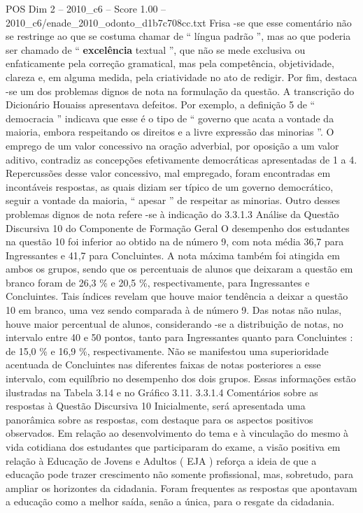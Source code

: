 \begin{textsample}{POS Dim 2 – 2010\_c6 – Score 1.00 – 2010\_c6/enade\_2010\_odonto\_d1b7c708cc.txt}
Frisa -se que esse comentário não se restringe ao que se costuma chamar de “ língua padrão ”, mas ao que poderia ser chamado de “ \textbf{excelência} textual ”, que não se mede exclusiva ou enfaticamente pela correção gramatical, mas pela competência, objetividade, clareza e, em alguma medida, pela criatividade no ato de redigir.
Por fim, destaca -se um dos problemas dignos de nota na formulação da questão.
A transcrição do Dicionário Houaiss apresentava defeitos.
Por exemplo, a definição 5 de “ democracia ” indicava que esse é o tipo de “ governo que acata a vontade da maioria, embora respeitando os direitos e a livre expressão das minorias ”.
O emprego de um valor concessivo na oração adverbial, por oposição a um valor aditivo, contradiz as concepções efetivamente democráticas apresentadas de 1 a 4.
Repercussões desse valor concessivo, mal empregado, foram encontradas em incontáveis respostas, as quais diziam ser típico de um governo democrático, seguir a vontade da maioria, “ apesar ” de respeitar as minorias.
Outro desses problemas dignos de nota refere -se à indicação do 3.3.1.3 Análise da Questão Discursiva 10 do Componente de Formação Geral O desempenho dos estudantes na questão 10 foi inferior ao obtido na de número 9, com nota média 36,7 para Ingressantes e 41,7 para Concluintes.
A nota máxima também foi atingida em ambos os grupos, sendo que os percentuais de alunos que deixaram a questão em branco foram de 26,3 \% e 20,5 \%, respectivamente, para Ingressantes e Concluintes.
Tais índices revelam que houve maior tendência a deixar a questão 10 em branco, uma vez sendo comparada à de número 9.
Das notas não nulas, houve maior percentual de alunos, considerando -se a distribuição de notas, no intervalo entre 40 e 50 pontos, tanto para Ingressantes quanto para Concluintes : de 15,0 \% e 16,9 \%, respectivamente.
Não se manifestou uma superioridade acentuada de Concluintes nas diferentes faixas de notas posteriores a esse intervalo, com equilíbrio no desempenho dos dois grupos.
Essas informações estão ilustradas na Tabela 3.14 e no Gráfico 3.11. 3.3.1.4 Comentários sobre as respostas à Questão Discursiva 10 Inicialmente, será apresentada uma panorâmica sobre as respostas, com destaque para os aspectos positivos observados.
Em relação ao desenvolvimento do tema e à vinculação do mesmo à vida cotidiana dos estudantes que participaram do exame, a visão positiva em relação à Educação de Jovens e Adultos ( EJA ) reforça a ideia de que a educação pode trazer crescimento não somente profissional, mas, sobretudo, para ampliar os horizontes da cidadania.
Foram frequentes as respostas que apontavam a educação como a melhor saída, senão a única, para o resgate da cidadania.

\end{textsample}
